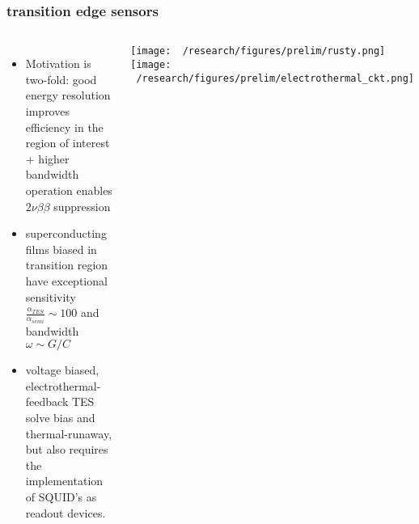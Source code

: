 \documentclass{beamer}
\begin{document}
%			
%			
	
	\begin{frame}
		\frametitle{transition edge sensors}
		\begin{columns}[c] %
			
			\begin{itemize}
				\setlength\itemsep{2em}
				\item Motivation is two-fold: good energy resolution improves efficiency in the region of interest + higher bandwidth operation enables $2\nu\beta\beta$ suppression
				\item superconducting films biased in transition region have exceptional sensitivity $\frac{\alpha_{TES}}{\alpha_{semi}} \sim 100$ and bandwidth $\omega \sim G/C$				
				\item voltage biased, electrothermal-feedback TES solve bias and thermal-runaway, but also requires the implementation of SQUID's as readout devices.
			\end{itemize}
			
			\texttt{[image: ~/research/figures/prelim/rusty.png]}
			\texttt{[image: ~/research/figures/prelim/electrothermal\_ckt.png]}
			
			
		\end{columns}
	\end{frame}		
	
\end{document}
